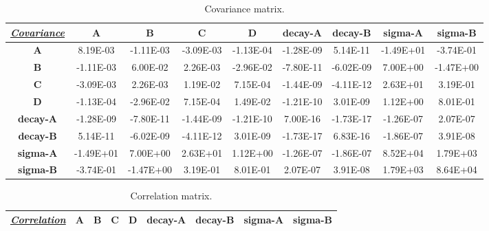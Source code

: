\begin{landscape}
\begin{table}[h!]
\centering
\caption{Covariance matrix.}
\label{covarianceComputed}
\begin{tabular}{|c|c|c|c|c|c|c|c|c|}
\hline
{\ul \textit{\textbf{Covariance}}} & \textbf{A} & \textbf{B} & \textbf{C} & \textbf{D} & \textbf{decay-A} & \textbf{decay-B} & \textbf{sigma-A} & \textbf{sigma-B} \\ \hline
\textbf{A}                         & 8.19E-03   & -1.11E-03  & -3.09E-03  & -1.13E-04  & -1.28E-09        & 5.14E-11         & -1.49E+01        & -3.74E-01        \\ \hline
\textbf{B}                         & -1.11E-03  & 6.00E-02   & 2.26E-03   & -2.96E-02  & -7.80E-11        & -6.02E-09        & 7.00E+00         & -1.47E+00        \\ \hline
\textbf{C}                         & -3.09E-03  & 2.26E-03   & 1.19E-02   & 7.15E-04   & -1.44E-09        & -4.11E-12        & 2.63E+01         & 3.19E-01         \\ \hline
\textbf{D}                         & -1.13E-04  & -2.96E-02  & 7.15E-04   & 1.49E-02   & -1.21E-10        & 3.01E-09         & 1.12E+00         & 8.01E-01         \\ \hline
\textbf{decay-A}                   & -1.28E-09  & -7.80E-11  & -1.44E-09  & -1.21E-10  & 7.00E-16         & -1.73E-17        & -1.26E-07        & 2.07E-07         \\ \hline
\textbf{decay-B}                   & 5.14E-11   & -6.02E-09  & -4.11E-12  & 3.01E-09   & -1.73E-17        & 6.83E-16         & -1.86E-07        & 3.91E-08         \\ \hline
\textbf{sigma-A}                   & -1.49E+01  & 7.00E+00   & 2.63E+01   & 1.12E+00   & -1.26E-07        & -1.86E-07        & 8.52E+04         & 1.79E+03         \\ \hline
\textbf{sigma-B}                   & -3.74E-01  & -1.47E+00  & 3.19E-01   & 8.01E-01   & 2.07E-07         & 3.91E-08         & 1.79E+03         & 8.64E+04         \\ \hline
\end{tabular}
\end{table}
\begin{table}[h!]
\centering
\caption{Correlation matrix.}
\label{pearsonComputed}
\begin{tabular}{|c|c|c|c|c|c|c|c|c|}
\hline
{\ul \textit{\textbf{Correlation}}} & \textbf{A} & \textbf{B} & \textbf{C} & \textbf{D} & \textbf{decay-A} & \textbf{decay-B} & \textbf{sigma-A} & \textbf{sigma-B} \\ \hline

\end{tabular}
\end{table}
\end{landscape}
